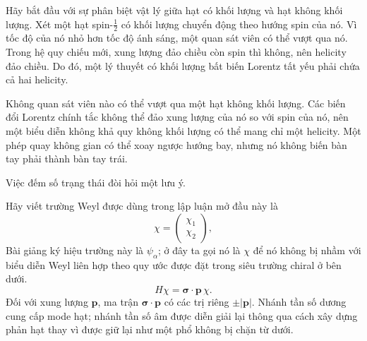 Hãy bắt đầu với sự phân biệt vật lý giữa hạt có khối lượng và hạt không khối lượng. Xét một hạt spin-\(\tfrac12\) có khối lượng chuyển động theo hướng spin của nó. Vì tốc độ của nó nhỏ hơn tốc độ ánh sáng, một quan sát viên có thể vượt qua nó. Trong hệ quy chiếu mới, xung lượng đảo chiều còn spin thì không, nên helicity đảo chiều. Do đó, một lý thuyết có khối lượng bất biến Lorentz tất yếu phải chứa cả hai helicity.

Không quan sát viên nào có thể vượt qua một hạt không khối lượng. Các biến đổi Lorentz chính tắc không thể đảo xung lượng của nó so với spin của nó, nên một biểu diễn không khả quy không khối lượng có thể mang chỉ một helicity. Một phép quay không gian có thể xoay ngược hướng bay, nhưng nó không biến bàn tay phải thành bàn tay trái.

\begin{classroomqa}
\end{classroomqa}

Việc đếm số trạng thái đòi hỏi một lưu ý.

Hãy viết trường Weyl được dùng trong lập luận mở đầu này là
\begin{equation}
\chi=
\begin{pmatrix}
\chi_1\\
\chi_2
\end{pmatrix},
\end{equation}
Bài giảng ký hiệu trường này là \(\psi_\alpha\); ở đây ta gọi nó là \(\chi\) để nó không bị nhầm với biểu diễn Weyl liên hợp theo quy ước được đặt trong siêu trường chiral ở bên dưới.
\begin{equation}
H\chi=\boldsymbol{\sigma}\cdot\mathbf p\,\chi.
\label{eq:l8-weyl-hamiltonian}
\end{equation}
Đối với xung lượng \(\mathbf p\), ma trận \(\boldsymbol{\sigma}\cdot\mathbf p\) có các trị riêng \(\pm|\mathbf p|\). Nhánh tần số dương cung cấp mode hạt; nhánh tần số âm được diễn giải lại thông qua cách xây dựng phản hạt thay vì được giữ lại như một phổ không bị chặn từ dưới.

